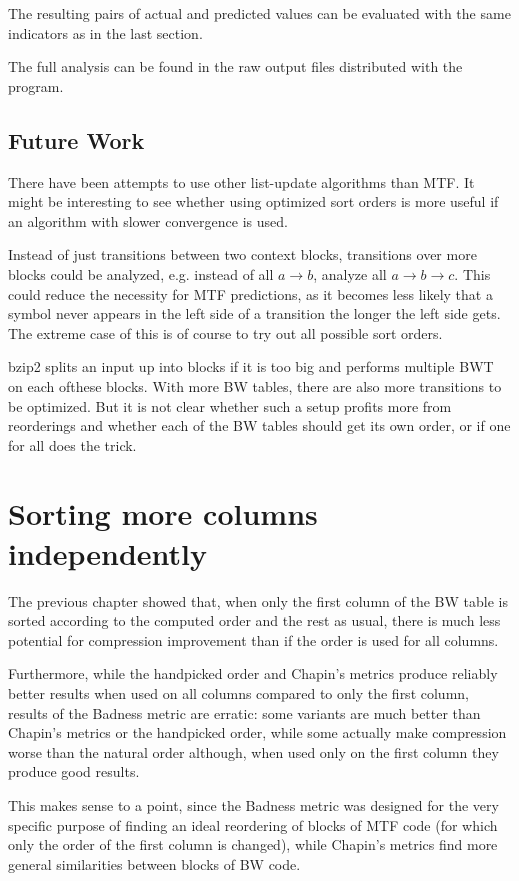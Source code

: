 \documentclass[a4paper]{scrreprt}
\begin{document}
The resulting pairs of actual and predicted values can be evaluated with the
same indicators as in the last section.

The full analysis can be found in the raw output files distributed with the
program.

\section{Future Work}

There have been attempts to use other list-update algorithms than MTF. It might
be interesting to see whether using optimized sort orders is more useful if an
algorithm with slower convergence is used.

Instead of just transitions between two context blocks, transitions over more
blocks could be analyzed, e.g. instead of all \(a \rightarrow b\), analyze all
\(a \rightarrow b \rightarrow c\). This could reduce the necessity for MTF
predictions, as it becomes less likely that a symbol never appears in the left
side of a transition the longer the left side gets. The extreme case of this is
of course to try out all possible sort orders.

bzip2 splits an input up into blocks if it is too big and performs multiple BWT
on each ofthese blocks. With more BW tables, there are also more transitions to
be optimized. But it is not clear whether such a setup profits more from
reorderings and whether each of the BW tables should get its own order, or if
one for all does the trick.

\chapter{Sorting more columns independently}

The previous chapter showed that, when only the first column of the BW table is
sorted according to the computed order and the rest as usual, there is much less
potential for compression improvement than if the order is used for all columns.

Furthermore, while the handpicked order and Chapin's metrics produce reliably
better results when used on all columns compared to only the first column,
results of the Badness metric are erratic: some variants are much better than
Chapin's metrics or the handpicked order, while some actually make compression
worse than the natural order although, when used only on the first column they
produce good results.

This makes sense to a point, since the Badness metric was designed for the very
specific purpose of finding an ideal reordering of blocks of MTF code (for
which only the order of the first column is changed), while Chapin's metrics
find more general similarities between blocks of BW code.
\end{document}

